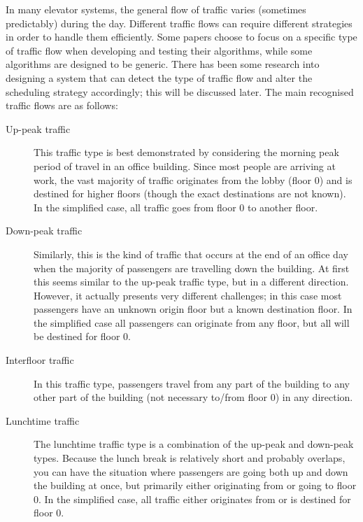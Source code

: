\documentclass{UoYCSproject}
\begin{document}
In many elevator systems, the general flow of traffic varies (sometimes predictably) during the day.  Different traffic flows can require different strategies in order to handle them efficiently.  Some papers choose to focus on a specific type of traffic flow when developing and testing their algorithms, while some algorithms are designed to be generic.  There has been some research into designing a system that can detect the type of traffic flow and alter the scheduling strategy accordingly; this will be discussed later.  The main recognised traffic flows are as follows:  \citep{Nikovski2003, Brand2004, Rong2003, Smith2002, Collins1993Patent, Bao1994, Pepyne1997}

\begin{description}
	\item[Up-peak traffic] This traffic type is best demonstrated by considering the morning peak period of travel in an office building.  Since most people are arriving at work, the vast majority of traffic originates from the lobby (floor 0) and is destined for higher floors (though the exact destinations are not known).  In the simplified case, all traffic goes from floor 0 to another floor.  \citep{Bao1994, Brand2004, Smith2002, Pepyne1997}
	\item[Down-peak traffic] Similarly, this is the kind of traffic that occurs at the end of an office day when the majority of passengers are travelling down the building.  At first this seems similar to the up-peak traffic type, but in a different direction.  However, it actually presents very different challenges; in this case most passengers have an unknown origin floor but a known destination floor.  In the simplified case all passengers can originate from any floor, but all will be destined for floor 0.  \citep{Bao1994, Brand2004, Smith2002, Pepyne1997}
	\item[Interfloor traffic] In this traffic type, passengers travel from any part of the building to any other part of the building (not necessary to/from floor 0) in any direction.  \citep{Pepyne1997, Collins1993Patent}
	\item[Lunchtime traffic] The lunchtime traffic type is a combination of the up-peak and down-peak types.  Because the lunch break is relatively short and probably overlaps, you can have the situation where passengers are going both up and down the building at once, but primarily either originating from or going to floor 0.  In the simplified case, all traffic either originates from or is destined for floor 0.  \citep{Bao1994, Brand2004, Smith2002, Pepyne1997}
\end{description}
\end{document}
